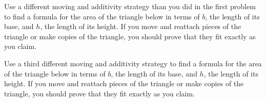 \documentclass[nooutcomes,noauthor, handout]{ximera}
\begin{document}
\begin{problem}
Use a different moving and additivity strategy than you did in the first problem to find a formula for the area of the triangle below in terms of $b$, the length of its base, and $h$, the length of its height. If you move and reattach pieces of the triangle or make copies of the triangle, you should prove that they fit exactly as you claim.

\begin{image}
\end{image}
\end{problem}

\begin{problem}
Use a third different moving and additivity strategy to find a formula for the area of the triangle below in terms of $b$, the length of its base, and $h$, the length of its height. If you move and reattach pieces of the triangle or make copies of the triangle, you should prove that they fit exactly as you claim.

\begin{image}
\end{image}
\end{problem}



\newpage
\end{document}
